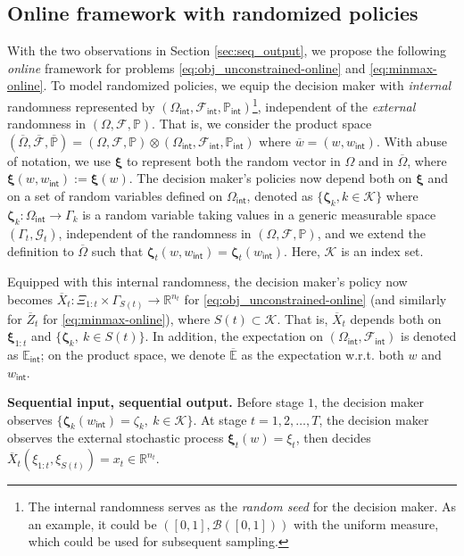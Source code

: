 \documentclass[11pt,fullpage,letterpaper]{article}
\newcommand{\mc}{\mathcal}
\newcommand{\R}{\mathbb{R}}
\newcommand{\E}{\mathbb{E}}
\newcommand{\p}{\mathbb{P}}
\newcommand{\bx}{\boldsymbol{\xi}}
\newcommand{\bz}{\boldsymbol{\zeta}}
\newcommand{\internal}{\mathsf{int}}
\begin{document}
\subsection{Online framework with randomized policies}\label{sec:product_space}
With the two observations in Section \ref{sec:seq_output}, we propose the following \textit{online} framework for problems \eqref{eq:obj_unconstrained-online} and \eqref{eq:minmax-online}. To model randomized policies, we equip the decision maker with \textit{internal} randomness represented by $(\Omega_{\internal},\mc F_{\internal},\p_{\internal})$\footnote{The internal randomness serves as the \textit{random seed} for the decision maker. As an example, it could be $([0,1],\mc B([0,1]))$ with the uniform measure, which could be used for subsequent sampling. }, independent of the \textit{external} randomness in $(\Omega,\mc F,\p)$. That is, we consider the product space $(\overline{\Omega},\overline{\mc F},\overline{\p})=(\Omega,\mc F,\p)\otimes (\Omega_{\internal},\mc F_{\internal},\p_{\internal})$ where $\overline{w} = (w,w_{\internal})$. With abuse of notation, we use $\bx$ to represent both the random vector in $\Omega$ and in $\overline{\Omega}$, where $\bx(w,w_{\internal}) := \bx(w)$. The decision maker's policies now depend both on $\bx$ and on a set of random variables defined on $\Omega_{\internal}$, denoted as $\{\bz_{k},k\in \mc K\}$ where $\bz_k:\Omega_{\internal}\to \Gamma_k$ is a random variable taking values in a generic measurable space $(\Gamma_t,\mc G_t)$, independent of the randomness in $(\Omega,\mc F,\p)$, and we extend the definition to $\overline{\Omega}$ such that $\bz_t(w,w_{\internal}) = \bz_t(w_{\internal})$. Here, $\mc K$ is an index set. 

Equipped with this internal randomness, the decision maker's policy now becomes $\overline{X}_t: \Xi_{1:t} \times \Gamma_{S(t)}\to \R^{n_t}$ for \eqref{eq:obj_unconstrained-online} (and similarly for $\overline{Z}_t$ for \eqref{eq:minmax-online}), where $S(t)\subset \mc K$. That is, $\overline{X}_t$ depends both on $\bx_{1:t}$ and $\{\bz_k,~k\in S(t)\}$. In addition, the expectation on $(\Omega_{\internal},\mc F_{\internal})$ is denoted as $\E_{\internal}$; on the product space, we denote $\overline{\E}$ as the expectation w.r.t. both $w$ and $w_{\internal}$. 

\textbf{Sequential input, sequential output.} Before stage $1$, the decision maker observes $\{\bz_{k}(w_{\internal}) = \zeta_k,~k\in \mc K\}$. At stage $t=1,2,\ldots,T$, the decision maker observes the external stochastic process $\bx_t(w)=\xi_t$, then decides $\overline{X}_t(\xi_{1:t},\xi_{S(t)}) = x_t\in \R^{n_t}$. 
\end{document}
